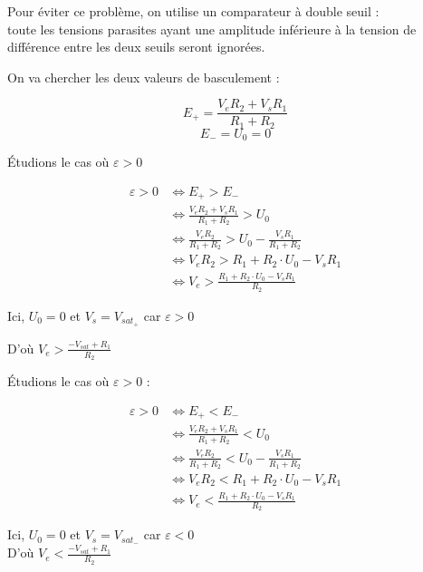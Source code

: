 Pour éviter ce problème, on utilise un comparateur à double seuil : \\
toute les tensions parasites ayant une amplitude inférieure à la tension de différence entre les deux seuils seront ignorées.\\


On va chercher les deux valeurs de basculement : 

$$E_+ = \frac{V_eR_2 + V_s R_1}{R_1 + R_2}$$
$$E_- = U_0=0$$

Étudions le cas où $\varepsilon>0$

\begin{align}
\varepsilon>0 & \Leftrightarrow E_+ > E_-\\
& \Leftrightarrow \frac{V_eR_2 + V_s R_1}{R_1 + R_2} > U_0 \\
& \Leftrightarrow \frac{V_eR_2}{R_1 + R_2} > U_0 -  \frac{V_s R_1 }{R_1 + R_2} \\
& \Leftrightarrow  V_eR_2 > R_1 + R_2 \cdot  U_0 -  V_s R_1 \\
& \Leftrightarrow  V_e > \frac{R_1 + R_2 \cdot  U_0 -  V_s R_1}{R_2}
\end{align}

Ici, $U_0=0$ et $V_s=V_{sat_+}$ car $\varepsilon>0$

D'où $V_e > \frac{-V_{sat} + R_1}{R_2}$




Étudions le cas où $\varepsilon>0$ : 

\begin{align}
\varepsilon>0 & \Leftrightarrow E_+ < E_-\\
& \Leftrightarrow \frac{V_eR_2 + V_s R_1}{R_1 + R_2} < U_0 \\
& \Leftrightarrow  \frac{V_eR_2}{R_1 + R_2} < U_0 -  \frac{V_s R_1 }{R_1 + R_2} \\
& \Leftrightarrow  V_eR_2 < R_1 + R_2 \cdot  U_0 -  V_s R_1 \\
& \Leftrightarrow  V_e < \frac{R_1 + R_2 \cdot  U_0 -  V_s R_1}{R_2}
\end{align}

Ici, $U_0=0$ et $V_s=V_{sat_-}$ car $\varepsilon<0$ \\

D'où $V_e < \frac{-V_{sat} + R_1}{R_2}$



